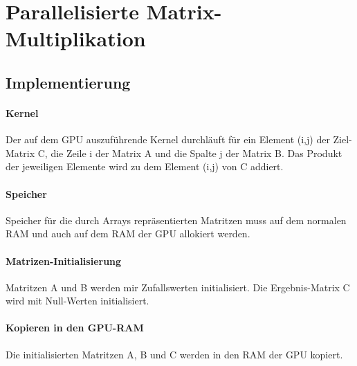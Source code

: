 \section{Parallelisierte Matrix-Multiplikation}


\subsection{Implementierung}
\paragraph{Kernel}
Der auf dem GPU auszuführende Kernel durchläuft für ein Element (i,j) der Ziel-Matrix C, die Zeile i der Matrix A und die Spalte j der Matrix B. Das Produkt der jeweiligen Elemente wird zu dem Element (i,j) von C addiert. 

\label{lst:a6-kernel}


\paragraph{Speicher}
Speicher für die durch Arrays repräsentierten Matritzen muss auf dem normalen RAM und auch auf dem RAM der GPU allokiert werden.
\label{lst:a6-init}


\paragraph{Matrizen-Initialisierung}
Matritzen A und B werden mir Zufallswerten initialisiert. Die Ergebnis-Matrix C wird mit Null-Werten initialisiert.
\label{lst:a6-init}


\paragraph{Kopieren in den GPU-RAM}
Die initialisierten Matritzen A, B und C werden in den RAM der GPU kopiert.
\label{lst:a6-init}



